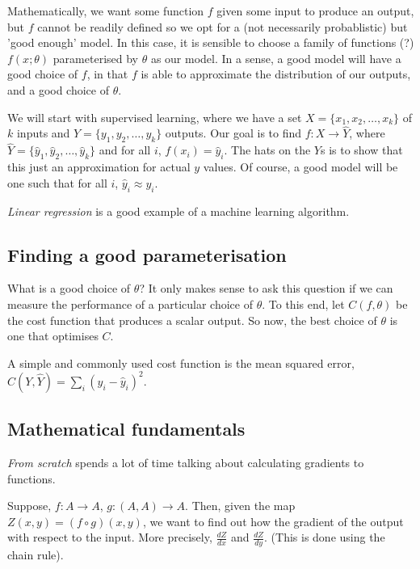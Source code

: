 \documentclass[11pt]{article}
\begin{document}
Mathematically, we want some function \(f\) given some input to produce an output, but \(f\) cannot be readily defined so we opt for a (not necessarily probablistic) but 'good enough' model. In this case, it is sensible to choose a family of functions (?) \(f ( x ; \theta )\) parameterised by \(\theta\) as our model. In a sense, a good model will have a good choice of \(f\), in that \(f\) is able to approximate the distribution of our outputs, and a good choice of \(\theta\).

We will start with supervised learning, where we have a set \(X = \{x_1, x_2, \dots, x_k \}\) of \(k\) inputs and \(Y = \{y_1, y_2, \dots, y_k\} \) outputs. Our goal is to find \(f : X \to \hat{Y}\), where \(\hat{Y} = \{ \hat{y}_1, \hat{y}_2, \dots, \hat{y}_k\}\) and for all \(i\), \( f(x_i) = \hat{y}_i \). The hats on the \(Y\)s is to show that this just an approximation for actual \(y\) values. Of course, a good model will be one such that for all \(i\), \(\hat{y}_i \approx y_i\).


\emph{Linear regression} is a good example of a machine learning algorithm.

\subsection{Finding a good parameterisation}
\label{sec:org62e1e7f}
What is a good choice of \(\theta\)? It only makes sense to ask this question if we can measure the performance of a particular choice of \(\theta\). To this end, let \(C(f, \theta)\) be the cost function that produces a scalar output. So now, the best choice of \(\theta\) is one that optimises \(C\).

A simple and commonly used cost function is the mean squared error, \(C(Y, \hat{Y}) = \sum_i (y_i - \hat{y}_i)^2\).



\subsection{Mathematical fundamentals}
\label{sec:orgc973878}
\emph{From scratch} spends a lot of time talking about calculating gradients to functions.

Suppose, \(f : A \to A\), \(g : (A, A) \to A\). Then, given the map \(Z(x, y) = (f \circ g) (x, y)\), we want to find out how the gradient of the output with respect to the input. More precisely, \(\frac{dZ}{dx}\) and \(\frac{dZ}{dy}\).
(This is done using the chain rule).
\end{document}
